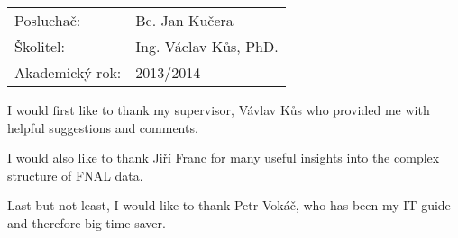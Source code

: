 \begin{tabular}{ll} 
{\Large Poslucha\v{c}:} & {\Large Bc. Jan Ku\v{c}era} \\[1mm]
{\Large \v{S}kolitel:} & {\Large Ing. V\'aclav K\r{u}s, PhD.} \\[2mm]
{\Large Akademick\'y rok:}     & {\Large 2013/2014}
\end{tabular}


%
%


\newpage

\thispagestyle{empty}



\vspace{1.5cm}


I would first like to thank my supervisor, V\'avlav K\r{u}s who provided me with helpful suggestions and comments. 

I would also like to thank Ji\v{r}\'i Franc for many useful insights into the complex structure of FNAL data.

Last but not least, I would like to thank  Petr Vok\'a\v{c}, who has been my IT guide and therefore big time saver. 

\vspace{2.5cm}



%
%
%
%
%
%

